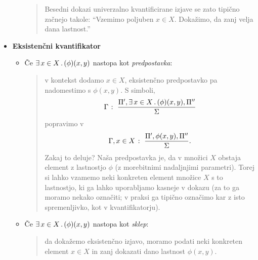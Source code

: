\begin{itemize}
\begin{itemize}
\begin{quote}
                                                Besedni dokazi univerzalno kvantificirane izjave se zato tipično začnejo takole: ``Vzemimo poljuben $x \in X$. Dokažimo, da zanj velja dana lastnost.''
                                        \end{quote}
                        \end{itemize}
                \item\textbf{Eksistenčni kvantifikator}
                        \begin{itemize}
                                \item
                                        Če $\some{x \in X} \phi(x, y)$ nastopa kot \emph{predpostavka}:
                                        \begin{quote}
                                                v kontekst dodamo $x \in X$, eksistenčno predpostavko pa nadomestimo s $\phi(x, y)$. S simboli,
                                                \[\claim{\Gamma}{\Pi', \some{x \in X} \phi(x, y), \Pi''}{\Sigma}\]
                                                popravimo v
                                                \[{\Gamma, x \in X} \;\colon\; \frac{\Pi', \phi(x, y), \Pi''}{\Sigma}.\]
                                                Zakaj to deluje? Naša predpostavka je, da v množici $X$ obstaja element z lastnostjo $\phi$ (z morebitnimi nadaljnjimi parametri). Torej si lahko vzamemo neki konkreten element množice $X$ s to lastnostjo, ki ga lahko uporabljamo kasneje v dokazu (za to ga moramo nekako označiti; v praksi ga tipično označimo kar z isto spremenljivko, kot v kvantifikatorju).
                                        \end{quote}
                                \item
                                        Če $\some{x \in X} \phi(x, y)$ nastopa kot \emph{sklep}:
                                        \begin{quote}
                                                da dokažemo eksistenčno izjavo, moramo podati neki konkreten element $x \in X$ in zanj dokazati dano lastnost $\phi(x, y)$. 
                                        \end{quote}
                        \end{itemize}
        \end{itemize}

